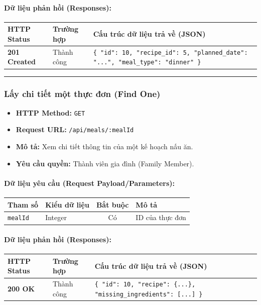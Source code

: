 \documentclass[12pt,a4paper]{article}
\begin{document}
\paragraph{Dữ liệu phản hồi (Responses):}
\begin{longtable}{|>{\raggedright\arraybackslash}p{2.8cm}|>{\raggedright\arraybackslash}p{3.2cm}|>{\raggedright\arraybackslash}p{8.0cm}|}
\hline
\textbf{HTTP Status} & \textbf{Trường hợp} & \textbf{Cấu trúc dữ liệu trả về (JSON)} \\ \hline
\endhead
\textbf{201 Created} & Thành công & \texttt{\{ "id": 10, "recipe\_id": 5, "planned\_date": "...", "meal\_type": "dinner" \}} \\ \hline
\end{longtable}

\vskip 0.4cm
\noindent\rule{\textwidth}{0.3pt}
\vskip 0.4cm

\subsubsection{Lấy chi tiết một thực đơn (Find One)}
\begin{itemize}[leftmargin=*]
    \item \textbf{HTTP Method:} \texttt{GET}
    \item \textbf{Request URL:} \texttt{/api/meals/:mealId}
    \item \textbf{Mô tả:} Xem chi tiết thông tin của một kế hoạch nấu ăn.
    \item \textbf{Yêu cầu quyền:} Thành viên gia đình (Family Member).
\end{itemize}

\paragraph{Dữ liệu yêu cầu (Request Payload/Parameters):}
\begin{longtable}{|>{\raggedright\arraybackslash}p{2.8cm}|>{\raggedright\arraybackslash}p{2.2cm}|c|>{\raggedright\arraybackslash}p{7.0cm}|}
\hline
\textbf{Tham số} & \textbf{Kiểu dữ liệu} & \textbf{Bắt buộc} & \textbf{Mô tả} \\ \hline
\endhead
\texttt{mealId} & Integer & Có & ID của thực đơn \\ \hline
\end{longtable}

\paragraph{Dữ liệu phản hồi (Responses):}
\begin{longtable}{|>{\raggedright\arraybackslash}p{2.8cm}|>{\raggedright\arraybackslash}p{3.2cm}|>{\raggedright\arraybackslash}p{8.0cm}|}
\hline
\textbf{HTTP Status} & \textbf{Trường hợp} & \textbf{Cấu trúc dữ liệu trả về (JSON)} \\ \hline
\endhead
\textbf{200 OK} & Thành công & \texttt{\{ "id": 10, "recipe": \{...\}, "missing\_ingredients": [...] \}} \\ \hline
\end{longtable}
\end{document}
